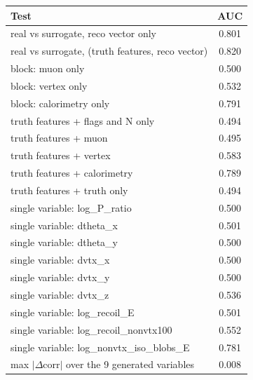 \begin{tabular}{lc}
\toprule
Test & AUC \\
\midrule
real vs surrogate, reco vector only & 0.801 \\
real vs surrogate, (truth features, reco vector) & 0.820 \\
\midrule
block: muon only & 0.500 \\
block: vertex only & 0.532 \\
block: calorimetry only & 0.791 \\
truth features + flags and N only & 0.494 \\
truth features + muon & 0.495 \\
truth features + vertex & 0.583 \\
truth features + calorimetry & 0.789 \\
truth features + truth only & 0.494 \\
single variable: log\_P\_ratio & 0.500 \\
single variable: dtheta\_x & 0.501 \\
single variable: dtheta\_y & 0.500 \\
single variable: dvtx\_x & 0.500 \\
single variable: dvtx\_y & 0.500 \\
single variable: dvtx\_z & 0.536 \\
single variable: log\_recoil\_E & 0.501 \\
single variable: log\_recoil\_nonvtx100 & 0.552 \\
single variable: log\_nonvtx\_iso\_blobs\_E & 0.781 \\
\midrule
max $|\Delta$corr$|$ over the 9 generated variables & 0.008 \\
\bottomrule
\end{tabular}
